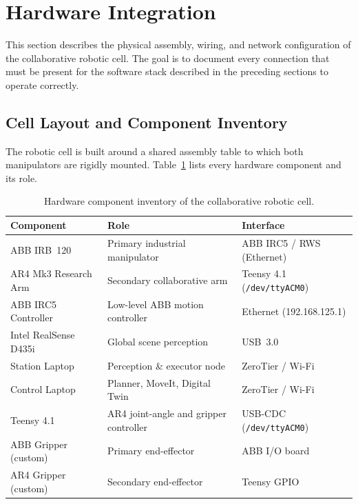 \section{Hardware Integration}
\label{sec:ch6_hardware}

This section describes the physical assembly, wiring, and network configuration of the
collaborative robotic cell.  The goal is to document every connection that must be present for
the software stack described in the preceding sections to operate correctly.

\subsection{Cell Layout and Component Inventory}
\label{subsec:ch6_cell_layout}

The robotic cell is built around a shared assembly table to which both manipulators are rigidly
mounted.  Table~\ref{tab:ch6_hw_inventory} lists every hardware component and its role.

\begin{table}[H]
\centering
\caption{Hardware component inventory of the collaborative robotic cell.}
\label{tab:ch6_hw_inventory}
\setlength{\tabcolsep}{5pt}
\begin{tabular}{lll}
\toprule
\textbf{Component}         & \textbf{Role}                          & \textbf{Interface} \\
\midrule
ABB IRB~120                & Primary industrial manipulator         & ABB IRC5 / RWS (Ethernet) \\
AR4 Mk3 Research Arm       & Secondary collaborative arm            & Teensy 4.1 (\texttt{/dev/ttyACM0}) \\
ABB IRC5 Controller        & Low-level ABB motion controller        & Ethernet (192.168.125.1) \\
Intel RealSense D435i       & Global scene perception                & USB~3.0 \\
Station Laptop             & Perception \& executor node            & ZeroTier / Wi-Fi \\
Control Laptop             & Planner, MoveIt, Digital Twin          & ZeroTier / Wi-Fi \\
Teensy 4.1                 & AR4 joint-angle and gripper controller & USB-CDC (\texttt{/dev/ttyACM0}) \\
ABB Gripper (custom)       & Primary end-effector                   & ABB I/O board \\
AR4 Gripper (custom)       & Secondary end-effector                 & Teensy GPIO \\
\bottomrule
\end{tabular}
\end{table}

